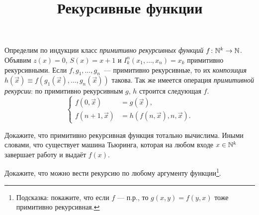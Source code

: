 \documentclass[a4paper, 12pt, num=Г1]{listok}
\begin{document}
\title{Рекурсивные функции}
\maketitle
\begin{definition}
	Определим по индукции класс \textit{примитивно рекурсивных функций $f \colon \mathbb{N}^k \to \mathbb{N}$}.
	Объявим $z(x) = 0$, $S(x) = x + 1$ и $I_k^n(x_1, \dots, x_n) = x_k$ примитивно рекурсивными.
	Если $f, g_1, \dots, g_n$~--- примитивно рекурсивные,
	то их \textit{композиция} $h(\vec x) \equiv f(g_1(\vec x), \dots, g_n(\vec x))$ такова.
	Так же имеется операция \textit{примитивной рекурсии}: по примитивно рекурсивным $g$, $h$ строится следующая $f$.
	\[
		\left \{
			\begin{aligned}
				f(0, \vec x) & = g(\vec x),\\
				f(n + 1, \vec x) & = h(f(n, \vec x), n, \vec x).
			\end{aligned}
		\right .
	\]
\end{definition}
\begin{problem}
	Докажите, что примитивно рекурсивная функция тотально вычислима.
	Иными словами, что существует машина Тьюринга, которая на любом входе $x \in \mathbb{N}^k$ завершает работу и выдаёт $f(x)$.
\end{problem}
\begin{problem}
	Докажите, что можно вести рекурсию по любому аргументу функции\footnote{Подсказка: покажите, что если $f$ --- п.р.,
	то $g(x, y) = f(y, x)$ тоже примитивно рекурсивная.}.
\end{problem}
\end{document}
